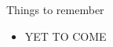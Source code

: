 \begin{frame}{Things to remember}
  \bigskip
  \begin{itemize}
  \item YET TO COME
  \end{itemize}
\end{frame}
%
